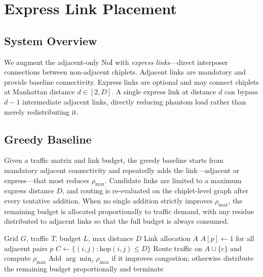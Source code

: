 \documentclass[conference]{IEEEtran}
\newcommand{\rhomax}{\rho_{\max}}
\begin{document}
\section{Express Link Placement}

\subsection{System Overview}

We augment the adjacent-only NoI with \textit{express links}---direct interposer connections between non-adjacent chiplets. Adjacent links are mandatory and provide baseline connectivity. Express links are optional and may connect chiplets at Manhattan distance $d \in [2, D]$. A single express link at distance $d$ can bypass $d{-}1$ intermediate adjacent links, directly reducing phantom load rather than merely redistributing it.

\subsection{Greedy Baseline}

Given a traffic matrix and link budget, the greedy baseline starts from mandatory adjacent connectivity and repeatedly adds the link---adjacent or express---that most reduces $\rhomax$. Candidate links are limited to a maximum express distance $D$, and routing is re-evaluated on the chiplet-level graph after every tentative addition. When no single addition strictly improves $\rhomax$, the remaining budget is allocated proportionally to traffic demand, with any residue distributed to adjacent links so that the full budget is always consumed.

\begin{algorithm}[t]
\caption{Greedy Express Link Placement}
\label{alg:greedy_express}
\footnotesize
\begin{algorithmic}[1]
\REQUIRE Grid $G$, traffic $T$, budget $L$, max distance $D$
\ENSURE Link allocation $A$
\STATE $A[p] \leftarrow 1$ for all adjacent pairs $p$
\STATE $C \leftarrow \{(i,j): \mathrm{hop}(i,j) \le D\}$
        \STATE Route traffic on $A \cup \{c\}$ and compute $\rhomax$
    \ENDFOR
    \STATE Add $\arg\min_c \rhomax$ if it improves congestion;
    \STATE otherwise distribute the remaining budget proportionally and terminate
\ENDWHILE
\end{algorithmic}
\end{algorithm}
\end{document}
